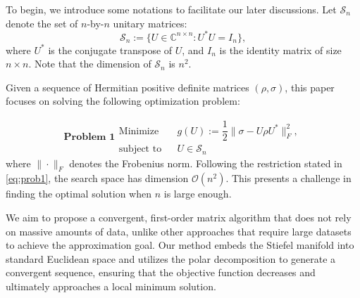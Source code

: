 \documentclass[sn-mathphys-num]{sn-jnl}%
\theoremstyle{thmstyleone}%
\theoremstyle{thmstyletwo}%
\theoremstyle{thmstylethree}%
\begin{document}
To begin, we introduce some notations to facilitate our later discussions. Let $\mathcal{S}_n$ denote the set of {$n$-by-$n$} unitary matrices:
\begin{equation*}
\mathcal{S}_n := \{U\in\mathbb{C}^{n\times n}: U^*U = I_n\},
\end{equation*}
where $U^*$ is the conjugate transpose of $ U $, and $I_n$ is the identity matrix of size $ n \times n$. Note that the dimension of $\mathcal{S}_n$ is $n^2$.

Given a sequence of Hermitian positive {\color{black}definite} matrices 
$(\rho, \sigma)$,
this paper focuses on solving the following optimization problem:

\begin{subequations}
\textbf{Problem 1}
\begin{eqnarray} 
\text{Minimize} && g(U) := \dfrac{1}{2}\displaystyle
\|\sigma - U \rho U^* \|_F^2,\\
\text{subject to} && U\in \mathcal{S}_n 
\end{eqnarray}
\end{subequations}\label{eq:prob1}
 where $ \|\cdot\|_F $ denotes the Frobenius norm. {Following the restriction stated in \eqref{eq:prob1}, the search space has dimension $\mathcal{O}(n^2)$. This presents a challenge in finding the optimal solution when $n$ is large enough.}

We aim to propose a convergent, first-order matrix algorithm that does not rely on massive amounts of data, unlike other approaches that require large datasets to achieve the approximation goal. Our method embeds the Stiefel manifold into standard Euclidean space and utilizes the polar decomposition to generate a convergent sequence, ensuring that the objective function decreases and ultimately approaches a local minimum solution.
\end{document}
